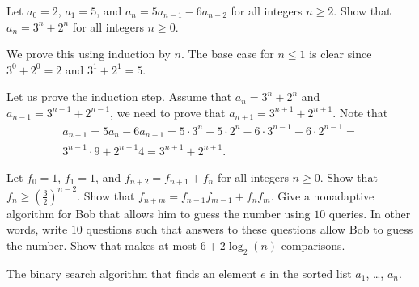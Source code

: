 \begin{chapterendexercises}
    \exercise Let $a_0 = 2$, $a_1 = 5$, and $a_n = 5a_{n - 1} - 6 a_{n - 2}$
        for all integers $n \ge 2$. Show that $a_n = 3^n + 2^n$ for all integers
        $n \ge 0$.
        \begin{solution}
            We prove this using induction by $n$. The base case for $n \le 1$ is clear
            since $3^0 + 2^0 = 2$ and $3^1 + 2^1 = 5$.

            Let us prove the induction step. Assume that $a_n = 3^n + 2^n$ and
            $a_{n - 1} = 3^{n - 1} + 2^{n - 1}$, we need to prove that
            $a_{n + 1} = 3^{n + 1} + 2^{n + 1}$. Note that
            \begin{multline*}
                a_{n + 1} = 5a_n - 6 a_{n - 1} =
                5 \cdot 3^n + 5 \cdot 2^n - 6 \cdot 3^{n - 1} -
                6 \cdot 2^{n - 1} = \\
                3^{n - 1} \cdot 9 + 2^{n - 1} 4 = 3^{n + 1} + 2^{n + 1}.
            \end{multline*}
        \end{solution}
    \exercise Let $f_0 = 1$, $f_1 = 1$, and $f_{n + 2} = f_{n + 1} + f_n$ for
        all integers $n \ge 0$. Show that
        $f_n \ge \left(\frac{3}{2}\right)^{n - 2}$.
    \exercise Show that $f_{n + m} = f_{n - 1} f_{m - 1} + f_n f_m$.
    \exercise Give a nonadaptive algorithm for Bob that allows him to guess the
      number using $10$ queries. In other words, write $10$ questions such that
      answers to these questions allow Bob to guess the number.
    \exercise Show that  makes at most
      $6 + 2\log_2(n)$ comparisons.
      \begin{algorithm}
        \begin{algorithmic}[1]
                  \State{}
                 \EndIf
              \EndFor
            \Else
                \State{}
              \Else
                \State{}
              \EndIf
            \EndIf
          \EndFunction
        \end{algorithmic}
        \caption{The binary search algorithm that finds an element $e$ in the sorted
          list $a_1$, \dots, $a_n$.}
        \label{algorithm:binary-search}
      \end{algorithm}
\end{chapterendexercises}
